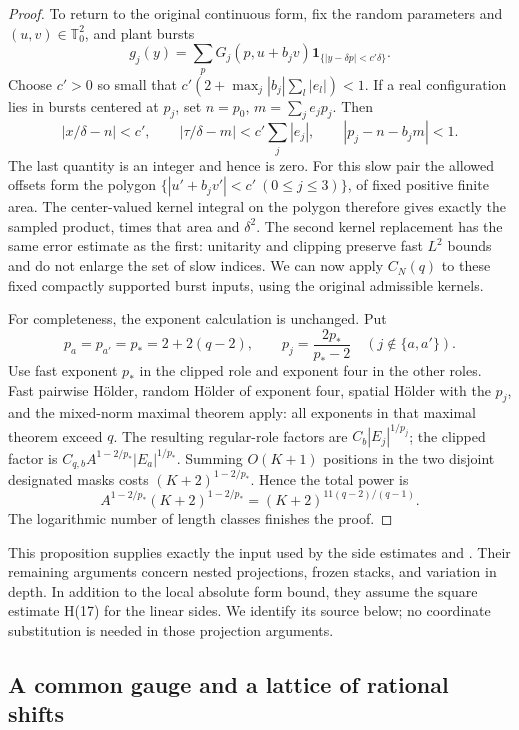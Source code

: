 \begin{proof}
To return to the original continuous form, fix the random parameters
and \((u,v)\in\mathbb T_0^2\), and plant bursts
\[
 g_j(y)=\sum_pG_j(p,u+b_jv)
                   \mathbf1_{\{|y-\delta p|<c'\delta\}}.
\]
Choose \(c'>0\) so small that
\(c'(2+\max_j|b_j|\sum_l|e_l|)<1\).
If a real configuration lies in bursts centered at \(p_j\), set
\(n=p_0\), \(m=\sum_j e_jp_j\).  Then
\[
 |x/\delta-n|<c',\qquad
 |\tau/\delta-m|<c'\sum_j|e_j|,
 \qquad |p_j-n-b_jm|<1.
\]
The last quantity is an integer and hence is zero.  For this slow
pair the allowed offsets form the polygon
\(\{|u'+b_jv'|<c'\ (0\le j\le3)\}\), of fixed positive finite area.
The center-valued kernel integral on the polygon therefore gives
exactly the sampled product, times that area and \(\delta^2\).
The second kernel replacement has the same error estimate as the
first: unitarity and clipping preserve fast \(L^2\) bounds and do
not enlarge the set of slow indices.  We can now apply \(C_N(q)\)
to these fixed compactly supported burst inputs, using the original
admissible kernels.

For completeness, the exponent calculation is unchanged.  Put
\[
 p_a=p_{a'}=p_*=2+2(q-2),\qquad
 p_j=\frac{2p_*}{p_*-2}\quad(j\notin\{a,a'\}).
\]
Use fast exponent \(p_*\) in the clipped role and exponent four
in the other roles.  Fast pairwise H\"older, random H\"older of
exponent four, spatial H\"older with the \(p_j\), and the mixed-norm
maximal theorem \cite[Lemma~7.1]{H} apply: all exponents in that
maximal theorem exceed \(q\).  The resulting regular-role factors
are \(C_b|E_j|^{1/p_j}\); the clipped factor is
\(C_{q,b}A^{1-2/p_*}|E_a|^{1/p_*}\).
Summing \(O(K+1)\) positions in the two disjoint designated masks
costs \((K+2)^{1-2/p_*}\).  Hence the total power is
\[
 A^{1-2/p_*}(K+2)^{1-2/p_*}
       =(K+2)^{11(q-2)/(q-1)}.
\]
The logarithmic number of length classes finishes the proof.
\end{proof}

This proposition supplies exactly the input used by the side estimates
\cite[Lemmas~7.3--7.4 and Proposition~7.5]{H} and
\cite[Section~6.5]{V}.  Their remaining arguments concern nested
projections, frozen stacks, and variation in depth.  In addition to the
local absolute form bound, they assume the square estimate H(17) for
the linear sides.  We identify its source below; no coordinate
substitution is needed in those projection arguments.

\subsection{A common gauge and a lattice of rational shifts}

